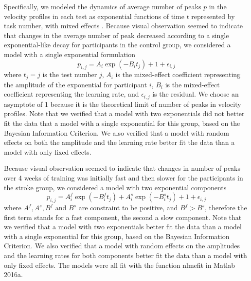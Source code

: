 Specifically, we modeled the dynamics of average number of peaks $ p $ in the velocity profiles in each test as exponential functions of time $ t $ represented by task number, with mixed effects \cite{Lindstrom1990}. 
Because visual observation seemed to indicate that changes in the average number of peak decreased according to a single exponential-like decay for participants in the control group, we considered a model with a single exponential formulation
\begin{equation}\label{eqn:singleexp}
p_{i,j} = A_i \exp(-B_i t_{j}) + 1 + \epsilon_{i,j}
\end{equation}
where $ t_{j} = j $ is the test number $ j $, 
$ A_i $ is the mixed-effect coefficient representing the amplitude of the exponential for participant $ i $,
$ B_i $ is the mixed-effect coefficient representing the learning rate,
and $ \epsilon_{i,j} $ is the residual. 
We choose an asymptote of 1 because it is the theoretical limit of number of peaks in velocity profiles.
Note that we verified that a model with two exponentials did not better fit the data that a model with a single exponential for this group, based on the Bayesian Information Criterion. 
We also verified that a model with random effects on both the amplitude and the learning rate better fit the data than a model with only fixed effects. 

Because visual observation seemed to indicate that changes in number of peaks over 4 weeks of training was initially fast and then slower for the participants in the stroke group, we considered a model with two exponential components 
\begin{equation}\label{eqn:doubleexp}
p_{i,j} = A^f_{i} \exp(-B^f_{i} t_j) + A^s_{i} \exp(-B^s_{i} t_j) + 1 + \epsilon_{i,j}
\end{equation}
where $ A^f, A^s, B^f $ and $ B^s $ are constraint to be positive, and $ B^f > B^s $, therefore the first term stands for a fast component, the second a slow component. 
Note that we verified that a model with two exponentials better fit the data than a model with a single exponential for this group, based on the Bayesian Information Criterion. 
We also verified that a model with random effects on the amplitudes and the learning rates for both components better fit the data than a model with only fixed effects. 
The models were all fit with the function \textsf{nlmefit} in Matlab 2016a.



